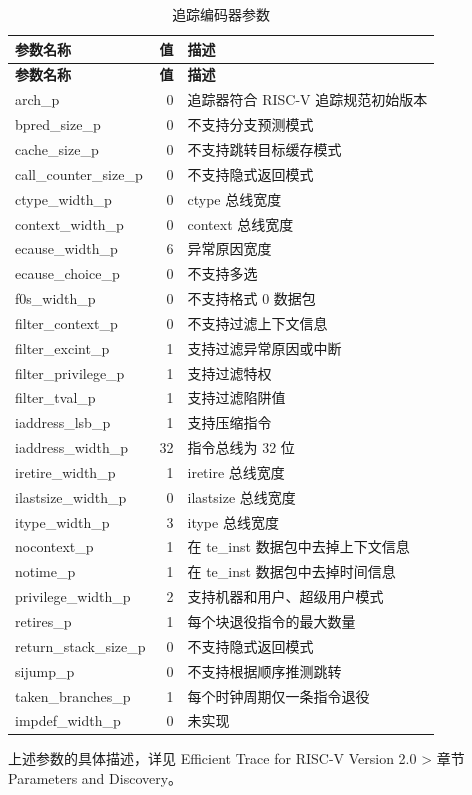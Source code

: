 \documentclass[main\_\_CN.tex]{subfiles}
\begin{document}
\begin{longtable}[c]{ |l|r|l| }
    \caption{追踪编码器参数}
    \label{tab:encoder_parameters}
    \\\hline
    \rowcolor{lightgray}
    \textbf{参数名称} & \textbf{值} & \textbf{描述} \\\hline
    \endfirsthead

    \hline
    \rowcolor{lightgray}
    \textbf{参数名称} & \textbf{值} & \textbf{描述} \\\hline
    \endhead
    \endfoot
    \endlastfoot

    arch\_p & 0 & 追踪器符合 RISC-V 追踪规范初始版本  \\\hline
    bpred\_size\_p & 0 & 不支持分支预测模式 \\\hline
    cache\_size\_p & 0 & 不支持跳转目标缓存模式 \\\hline
    call\_counter\_size\_p & 0 & 不支持隐式返回模式 \\\hline
    ctype\_width\_p & 0 & ctype 总线宽度 \\\hline
    context\_width\_p & 0 & context 总线宽度 \\\hline
    ecause\_width\_p & 6 & 异常原因宽度 \\\hline
    ecause\_choice\_p & 0 & 不支持多选 \\\hline
    f0s\_width\_p & 0 & 不支持格式 0 数据包 \\\hline
    filter\_context\_p & 0 & 不支持过滤上下文信息 \\\hline
    filter\_excint\_p & 1 & 支持过滤异常原因或中断 \\\hline
    filter\_privilege\_p & 1 & 支持过滤特权 \\\hline
    filter\_tval\_p & 1 & 支持过滤陷阱值 \\\hline
    iaddress\_lsb\_p & 1 & 支持压缩指令 \\\hline
    iaddress\_width\_p & 32 & 指令总线为 32 位 \\\hline
    iretire\_width\_p & 1 & iretire 总线宽度 \\\hline
    ilastsize\_width\_p & 0 & ilastsize 总线宽度 \\\hline
    itype\_width\_p & 3 & itype 总线宽度  \\\hline
    nocontext\_p & 1 & 在 te\_inst 数据包中去掉上下文信息 \\\hline
    notime\_p & 1 & 在 te\_inst 数据包中去掉时间信息 \\\hline
    privilege\_width\_p & 2 & 支持机器和用户、超级用户模式 \\\hline
    retires\_p & 1 & 每个块退役指令的最大数量 \\\hline
    return\_stack\_size\_p & 0 & 不支持隐式返回模式 \\\hline
    sijump\_p & 0 & 不支持根据顺序推测跳转 \\\hline
    taken\_branches\_p & 1 & 每个时钟周期仅一条指令退役 \\\hline
    impdef\_width\_p & 0 & 未实现 \\\hline

 \end{longtable}
上述参数的具体描述，详见 Efficient Trace for RISC-V Version 2.0 > 章节 Parameters and Discovery。
\end{document}
